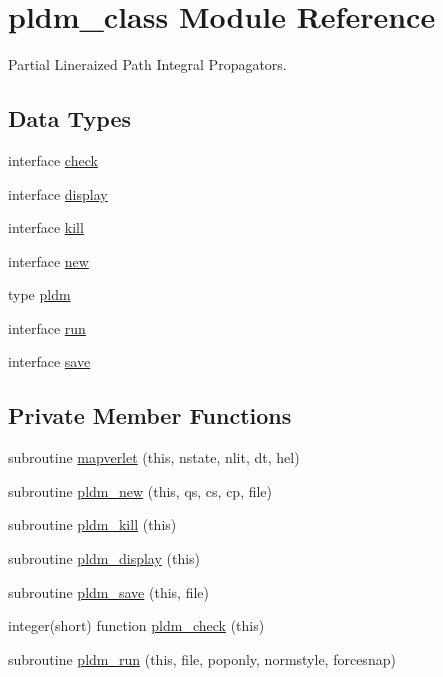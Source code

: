 \hypertarget{classpldm__class}{\section{pldm\-\_\-class Module Reference}
\label{classpldm__class}
}


Partial Lineraized Path Integral Propagators.  


\subsection*{Data Types}
\begin{DoxyCompactItemize}
\item 
interface \hyperlink{interfacepldm__class_1_1check}{check}
\item 
interface \hyperlink{interfacepldm__class_1_1display}{display}
\item 
interface \hyperlink{interfacepldm__class_1_1kill}{kill}
\item 
interface \hyperlink{interfacepldm__class_1_1new}{new}
\item 
type \hyperlink{structpldm__class_1_1pldm}{pldm}
\item 
interface \hyperlink{interfacepldm__class_1_1run}{run}
\item 
interface \hyperlink{interfacepldm__class_1_1save}{save}
\end{DoxyCompactItemize}
\subsection*{Private Member Functions}
\begin{DoxyCompactItemize}
\item 
subroutine \hyperlink{classpldm__class_a56bc2a02f61ba7f0ef59c429a9f1e038}{mapverlet} (this, nstate, nlit, dt, hel)
\item 
subroutine \hyperlink{classpldm__class_a12da2274f89c7978903a0e5de4c0a2a7}{pldm\-\_\-new} (this, qs, cs, cp, file)
\item 
subroutine \hyperlink{classpldm__class_ae3cf3688fae95f3ab1729475a8fde0fd}{pldm\-\_\-kill} (this)
\item 
subroutine \hyperlink{classpldm__class_a0b7b20ee63a6203b24c700190738338b}{pldm\-\_\-display} (this)
\item 
subroutine \hyperlink{classpldm__class_aa71a81cb75e284923b6a6f8e4085c564}{pldm\-\_\-save} (this, file)
\item 
integer(short) function \hyperlink{classpldm__class_a87937cd139205ea96672b513c5124b8f}{pldm\-\_\-check} (this)
\item 
subroutine \hyperlink{classpldm__class_acb662f59407b2a0bd62fc36aab876482}{pldm\-\_\-run} (this, file, poponly, normstyle, forcesnap)
\end{DoxyCompactItemize}
